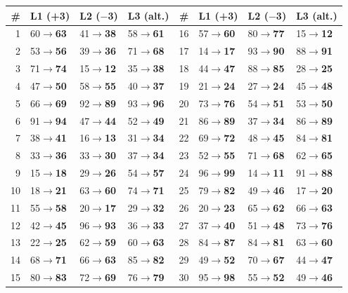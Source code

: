 \documentclass[10pt,a4paper]{article}
\begin{document}
{\small\begin{tabular}{@{}rlll@{\hspace{1.2cm}}rlll@{}}\toprule \# & L1 (+3) & L2 ($-$3) & L3 (alt.) & \# & L1 (+3) & L2 ($-$3) & L3 (alt.)\\ \midrule
1 & 60$\to$\textbf{63} & 41$\to$\textbf{38} & 58$\to$\textbf{61} & 16 & 57$\to$\textbf{60} & 80$\to$\textbf{77} & 15$\to$\textbf{12}\\
2 & 53$\to$\textbf{56} & 39$\to$\textbf{36} & 71$\to$\textbf{68} & 17 & 14$\to$\textbf{17} & 93$\to$\textbf{90} & 88$\to$\textbf{91}\\
3 & 71$\to$\textbf{74} & 15$\to$\textbf{12} & 35$\to$\textbf{38} & 18 & 44$\to$\textbf{47} & 88$\to$\textbf{85} & 28$\to$\textbf{25}\\
4 & 47$\to$\textbf{50} & 58$\to$\textbf{55} & 40$\to$\textbf{37} & 19 & 21$\to$\textbf{24} & 27$\to$\textbf{24} & 45$\to$\textbf{48}\\
5 & 66$\to$\textbf{69} & 92$\to$\textbf{89} & 93$\to$\textbf{96} & 20 & 73$\to$\textbf{76} & 54$\to$\textbf{51} & 53$\to$\textbf{50}\\
6 & 91$\to$\textbf{94} & 47$\to$\textbf{44} & 52$\to$\textbf{49} & 21 & 86$\to$\textbf{89} & 37$\to$\textbf{34} & 86$\to$\textbf{89}\\
7 & 38$\to$\textbf{41} & 16$\to$\textbf{13} & 31$\to$\textbf{34} & 22 & 69$\to$\textbf{72} & 48$\to$\textbf{45} & 84$\to$\textbf{81}\\
8 & 33$\to$\textbf{36} & 33$\to$\textbf{30} & 37$\to$\textbf{34} & 23 & 52$\to$\textbf{55} & 71$\to$\textbf{68} & 62$\to$\textbf{65}\\
9 & 15$\to$\textbf{18} & 29$\to$\textbf{26} & 54$\to$\textbf{57} & 24 & 96$\to$\textbf{99} & 14$\to$\textbf{11} & 91$\to$\textbf{88}\\
10 & 18$\to$\textbf{21} & 63$\to$\textbf{60} & 74$\to$\textbf{71} & 25 & 79$\to$\textbf{82} & 49$\to$\textbf{46} & 17$\to$\textbf{20}\\
11 & 55$\to$\textbf{58} & 20$\to$\textbf{17} & 29$\to$\textbf{32} & 26 & 20$\to$\textbf{23} & 65$\to$\textbf{62} & 66$\to$\textbf{63}\\
12 & 42$\to$\textbf{45} & 96$\to$\textbf{93} & 36$\to$\textbf{33} & 27 & 37$\to$\textbf{40} & 51$\to$\textbf{48} & 73$\to$\textbf{76}\\
13 & 22$\to$\textbf{25} & 62$\to$\textbf{59} & 60$\to$\textbf{63} & 28 & 84$\to$\textbf{87} & 84$\to$\textbf{81} & 63$\to$\textbf{60}\\
14 & 68$\to$\textbf{71} & 66$\to$\textbf{63} & 85$\to$\textbf{82} & 29 & 49$\to$\textbf{52} & 70$\to$\textbf{67} & 44$\to$\textbf{47}\\
15 & 80$\to$\textbf{83} & 72$\to$\textbf{69} & 76$\to$\textbf{79} & 30 & 95$\to$\textbf{98} & 55$\to$\textbf{52} & 49$\to$\textbf{46}\\
\bottomrule\end{tabular}}\par\medskip
\end{document}
